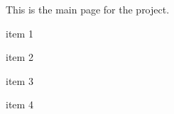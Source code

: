 This is the main page for the project.


\begin{DoxyEnumerate}
\item item 1
\item item 2
\item item 3
\item item 4 
\end{DoxyEnumerate}